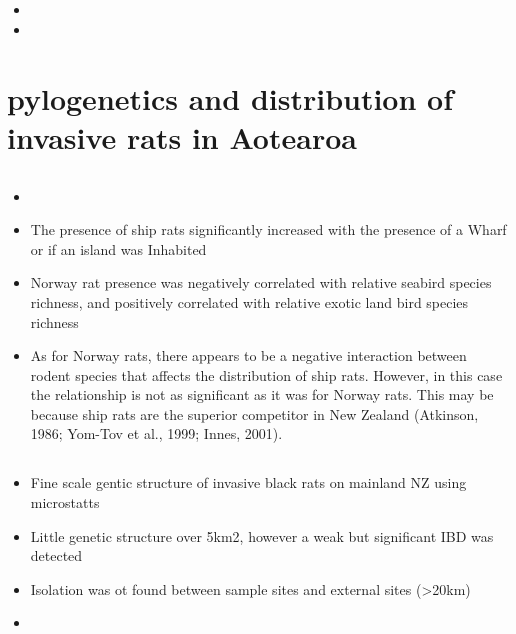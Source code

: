 \documentclass[document.tex]{subfiles}
\begin{document}
    \subsection{\citetitle{}}
    \begin{itemize}
    \item 
    \item 
    \end{itemize}

\section{pylogenetics and distribution of invasive rats in Aotearoa}

    \subsection{}
    \begin{itemize}
    \item 
    \item The presence of ship rats significantly increased with the presence of a Wharf or if an island was Inhabited
    \item Norway rat presence was negatively correlated with relative seabird species richness, and positively correlated with relative exotic land bird species richness
    \item As for Norway rats, there appears to be a negative interaction between rodent species that affects the distribution of ship rats. However, in this case the relationship is not as significant as it was for Norway rats. This may be because ship rats are the superior competitor in New Zealand (Atkinson, 1986; Yom-Tov et al., 1999; Innes, 2001).
    \end{itemize}

    \subsection{}
    \begin{itemize}
    \item Fine scale gentic structure of invasive black rats on mainland NZ using microstatts
    \item Little genetic structure over 5km2, however a weak but significant IBD was detected
    \item Isolation was ot found between sample sites and external sites (>20km)
    \item 
    \end{itemize}
\end{document}
